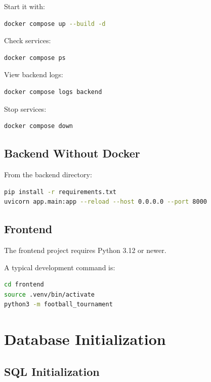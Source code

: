 \documentclass[11pt,a4paper]{article}
\begin{document}
Start it with:

\begin{lstlisting}[language=bash]
docker compose up --build -d
\end{lstlisting}

Check services:

\begin{lstlisting}[language=bash]
docker compose ps
\end{lstlisting}

View backend logs:

\begin{lstlisting}[language=bash]
docker compose logs backend
\end{lstlisting}

Stop services:

\begin{lstlisting}[language=bash]
docker compose down
\end{lstlisting}

\subsection{Backend Without Docker}

From the backend directory:

\begin{lstlisting}[language=bash]
pip install -r requirements.txt
uvicorn app.main:app --reload --host 0.0.0.0 --port 8000
\end{lstlisting}

\subsection{Frontend}

The frontend project requires Python 3.12 or newer.

A typical development command is:

\begin{lstlisting}[language=bash]
cd frontend
source .venv/bin/activate
python3 -m football_tournament
\end{lstlisting}

\section{Database Initialization}

\subsection{SQL Initialization}
\end{document}
